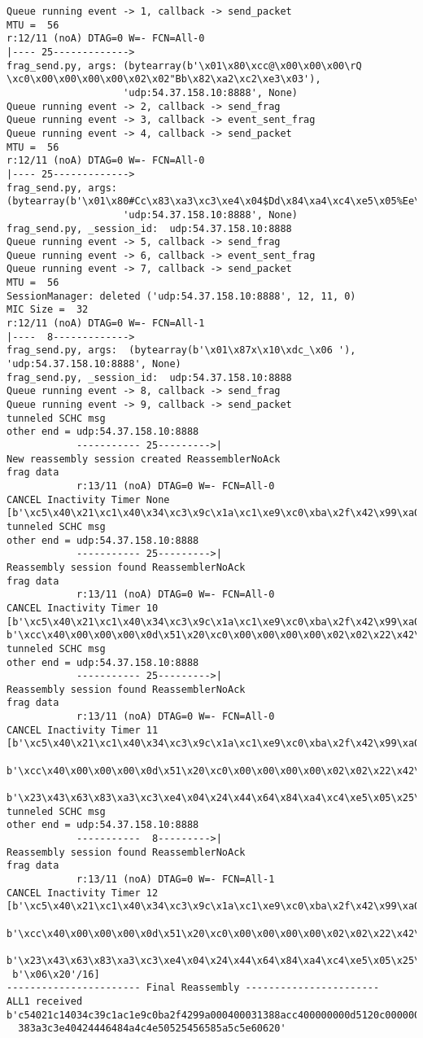 \begin{lstlisting}[basicstyle=\ttfamily\tiny, numbers=none]
Queue running event -> 1, callback -> send_packet
MTU =  56
r:12/11 (noA) DTAG=0 W=- FCN=All-0
|---- 25------------->
frag_send.py, args: (bytearray(b'\x01\x80\xcc@\x00\x00\x00\rQ \xc0\x00\x00\x00\x00\x02\x02"Bb\x82\xa2\xc2\xe3\x03'), 
                    'udp:54.37.158.10:8888', None)
Queue running event -> 2, callback -> send_frag
Queue running event -> 3, callback -> event_sent_frag
Queue running event -> 4, callback -> send_packet
MTU =  56
r:12/11 (noA) DTAG=0 W=- FCN=All-0
|---- 25------------->
frag_send.py, args: (bytearray(b'\x01\x80#Cc\x83\xa3\xc3\xe4\x04$Dd\x84\xa4\xc4\xe5\x05%Ee\x85\xa5\xc5\xe6'), 
                    'udp:54.37.158.10:8888', None)
frag_send.py, _session_id:  udp:54.37.158.10:8888
Queue running event -> 5, callback -> send_frag
Queue running event -> 6, callback -> event_sent_frag
Queue running event -> 7, callback -> send_packet
MTU =  56
SessionManager: deleted ('udp:54.37.158.10:8888', 12, 11, 0)
MIC Size =  32
r:12/11 (noA) DTAG=0 W=- FCN=All-1
|----  8------------->
frag_send.py, args:  (bytearray(b'\x01\x87x\x10\xdc_\x06 '), 'udp:54.37.158.10:8888', None)
frag_send.py, _session_id:  udp:54.37.158.10:8888
Queue running event -> 8, callback -> send_frag
Queue running event -> 9, callback -> send_packet
tunneled SCHC msg
other end = udp:54.37.158.10:8888
			----------- 25--------->|
New reassembly session created ReassemblerNoAck
frag data
			r:13/11 (noA) DTAG=0 W=- FCN=All-0
CANCEL Inactivity Timer None
[b'\xc5\x40\x21\xc1\x40\x34\xc3\x9c\x1a\xc1\xe9\xc0\xba\x2f\x42\x99\xa0\x00\x40\x00\x31\x38\x8a'/184]
tunneled SCHC msg
other end = udp:54.37.158.10:8888
			----------- 25--------->|
Reassembly session found ReassemblerNoAck
frag data
			r:13/11 (noA) DTAG=0 W=- FCN=All-0
CANCEL Inactivity Timer 10
[b'\xc5\x40\x21\xc1\x40\x34\xc3\x9c\x1a\xc1\xe9\xc0\xba\x2f\x42\x99\xa0\x00\x40\x00\x31\x38\x8a'/184, 
b'\xcc\x40\x00\x00\x00\x0d\x51\x20\xc0\x00\x00\x00\x00\x02\x02\x22\x42\x62\x82\xa2\xc2\xe3\x03'/184]
tunneled SCHC msg
other end = udp:54.37.158.10:8888
			----------- 25--------->|
Reassembly session found ReassemblerNoAck
frag data
			r:13/11 (noA) DTAG=0 W=- FCN=All-0
CANCEL Inactivity Timer 11
[b'\xc5\x40\x21\xc1\x40\x34\xc3\x9c\x1a\xc1\xe9\xc0\xba\x2f\x42\x99\xa0\x00\x40\x00\x31\x38\x8a'/184, 
 b'\xcc\x40\x00\x00\x00\x0d\x51\x20\xc0\x00\x00\x00\x00\x02\x02\x22\x42\x62\x82\xa2\xc2\xe3\x03'/184, 
 b'\x23\x43\x63\x83\xa3\xc3\xe4\x04\x24\x44\x64\x84\xa4\xc4\xe5\x05\x25\x45\x65\x85\xa5\xc5\xe6'/184]
tunneled SCHC msg
other end = udp:54.37.158.10:8888
			-----------  8--------->|
Reassembly session found ReassemblerNoAck
frag data
			r:13/11 (noA) DTAG=0 W=- FCN=All-1
CANCEL Inactivity Timer 12
[b'\xc5\x40\x21\xc1\x40\x34\xc3\x9c\x1a\xc1\xe9\xc0\xba\x2f\x42\x99\xa0\x00\x40\x00\x31\x38\x8a'/184, 
 b'\xcc\x40\x00\x00\x00\x0d\x51\x20\xc0\x00\x00\x00\x00\x02\x02\x22\x42\x62\x82\xa2\xc2\xe3\x03'/184, 
 b'\x23\x43\x63\x83\xa3\xc3\xe4\x04\x24\x44\x64\x84\xa4\xc4\xe5\x05\x25\x45\x65\x85\xa5\xc5\xe6'/184, 
 b'\x06\x20'/16]
----------------------- Final Reassembly -----------------------
ALL1 received
b'c54021c14034c39c1ac1e9c0ba2f4299a000400031388acc400000000d5120c000000000020222426282a2c2e30323436
  383a3c3e40424446484a4c4e50525456585a5c5e60620'
  

\end{lstlisting}
